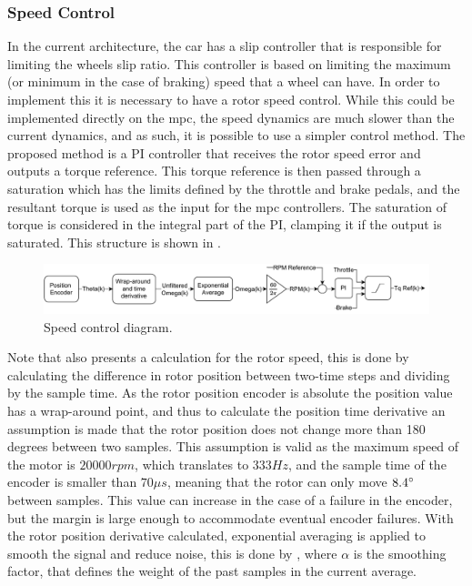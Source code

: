 

\subsubsection{Speed Control}
\label{section:speed_control}%

In the current architecture, the car has a slip controller that is responsible for limiting the wheels slip ratio. This controller is based on limiting the maximum (or minimum in the case of braking) speed that a wheel can have. In order to implement this it is necessary to have a rotor speed control. While this could be implemented directly on the \gls{mpc}, the speed dynamics are much slower than the current dynamics, and as such, it is possible to use a simpler control method. The proposed method is a PI controller that receives the rotor speed error and outputs a torque reference. This torque reference is then passed through a saturation which has the limits defined by the throttle and brake pedals, and the resultant torque is used as the input for the \gls{mpc} controllers. The saturation of torque is considered in the integral part of the PI, clamping it if the output is saturated. This structure is shown in .

\begin{figure}[!htb]
	\centering
	\includegraphics[width=1\textwidth]{Figures/Speed_control.pdf}
	\caption[Speed control diagram.]{Speed control diagram.}
	\label{fig:speed_control_diagram}%
\end{figure}

Note that  also presents a calculation for the rotor speed, this is done by calculating the difference in rotor position between two-time steps and dividing by the sample time. As the rotor position encoder is absolute the position value has a wrap-around point, and thus to calculate the position time derivative an assumption is made that the rotor position does not change more than 180 degrees between two samples. This assumption is valid as the maximum speed of the motor is $20000 rpm$, which translates to $333 Hz$, and the sample time of the encoder is smaller than  $70\mu s$, meaning that the rotor can only move $8.4 ^\circ\,$ between samples. This value can increase in the case of a failure in the encoder, but the margin is large enough to accommodate eventual encoder failures. With the rotor position derivative calculated, exponential averaging is applied to smooth the signal and reduce noise, this is done by , where $\alpha$ is the smoothing factor, that defines the weight of the past samples in the current average.

